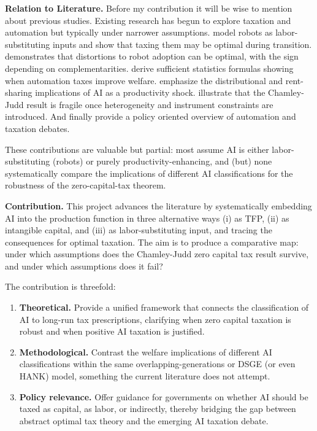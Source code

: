 \medskip

\noindent \textbf{Relation to Literature.}  
Before my contribution it will be wise to mention about previous studies. Existing research has begun to explore taxation and automation but typically under narrower assumptions. \citet{GuerreiroRebeloTeles2022} model robots as labor-substituting inputs and show that taxing them may be optimal during transition. \citet{Thummel2023} demonstrates that distortions to robot adoption can be optimal, with the sign depending on complementarities. \citet{CostinotWerning2022} derive sufficient statistics formulas showing when automation taxes improve welfare. \citet{KorinekStiglitz2018, KorinekStiglitz2021} emphasize the distributional and rent-sharing implications of AI as a productivity shock. \citet{SaezStantcheva2016} illustrate that the Chamley-Judd result is fragile once heterogeneity and instrument constraints are introduced. And finally \citet{BastaniWaldenstrom2024} provide a policy oriented overview of automation and taxation debates.  

These contributions are valuable but partial: most assume AI is either labor-substituting (robots) or purely productivity-enhancing, and (but) none systematically compare the implications of different AI classifications for the robustness of the zero-capital-tax theorem.  

\medskip

\noindent \textbf{Contribution.}  
This project advances the literature by systematically embedding AI into the production function in three alternative ways (i) as TFP, (ii) as intangible capital, and (iii) as labor-substituting input, and tracing the consequences for optimal taxation. The aim is to produce a comparative map: under which assumptions does the Chamley-Judd zero capital tax result survive, and under which assumptions does it fail?  

The contribution is threefold:  
\begin{enumerate}
    \item \textbf{Theoretical.} Provide a unified framework that connects the classification of AI to long-run tax prescriptions, clarifying when zero capital taxation is robust and when positive AI taxation is justified.  
    \item \textbf{Methodological.} Contrast the welfare implications of different AI classifications within the same overlapping-generations or DSGE (or even HANK) model, something the current literature does not attempt.  
    \item \textbf{Policy relevance.} Offer guidance for governments on whether AI should be taxed as capital, as labor, or indirectly, thereby bridging the gap between abstract optimal tax theory and the emerging AI taxation debate.  
\end{enumerate}

